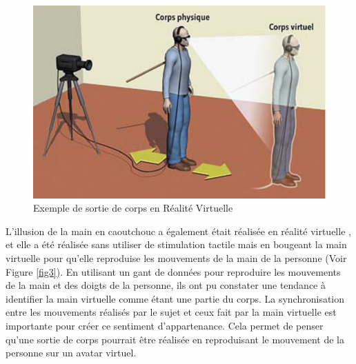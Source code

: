 \begin{figure}[h]
   	\centerline{\includegraphics[scale=0.5]{./oobRV}}
   	\caption{\label{fig2} Exemple de sortie de corps en Réalité Virtuelle \cite{bl10}}
\end{figure}

L'illusion de la main en caoutchouc a également était réalisée en réalité virtuelle \cite{sl09}, et elle a été réalisée sans utiliser de stimulation tactile mais en bougeant la main virtuelle pour qu'elle reproduise les mouvements de la main de la personne \cite{sl08}(Voir Figure \ref{fig3}). En utilisant un gant de données pour reproduire les mouvements de la main et des doigts de la personne, ils ont pu constater une tendance à identifier la main virtuelle comme étant une partie du corps. La synchronisation entre les mouvements réalisés par le sujet et ceux fait par la main virtuelle est importante pour créer ce sentiment d'appartenance. Cela permet de penser qu'une sortie de corps pourrait être réalisée en reproduisant le mouvement de la personne sur un avatar virtuel.


